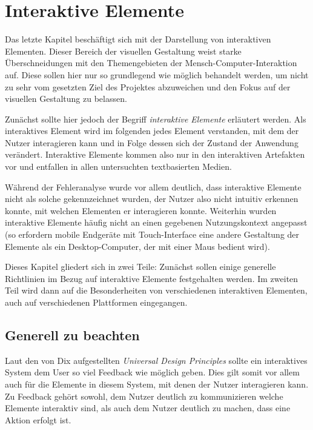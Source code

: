 
\chapter{Interaktive Elemente} %

\label{Interaktive-Elemente} %



Das letzte Kapitel beschäftigt sich mit der Darstellung von interaktiven Elementen. Dieser Bereich der visuellen Gestaltung weist starke Überschneidungen mit den Themengebieten der Mensch-Computer-Interaktion auf. Diese sollen hier nur so grundlegend wie möglich behandelt werden, um nicht zu sehr vom gesetzten Ziel des Projektes abzuweichen und den Fokus auf der visuellen Gestaltung zu belassen.

Zunächst sollte hier jedoch der Begriff \textit{interaktive Elemente} erläutert werden. Als interaktives Element wird im folgenden jedes Element verstanden, mit dem der Nutzer interagieren kann und in Folge dessen sich der Zustand der Anwendung verändert. Interaktive Elemente kommen also nur in den interaktiven Artefakten vor und entfallen in allen untersuchten textbasierten Medien.

Während der Fehleranalyse wurde vor allem deutlich, dass interaktive Elemente nicht als solche gekennzeichnet wurden, der Nutzer also nicht intuitiv erkennen konnte, mit welchen Elementen er interagieren konnte. Weiterhin wurden interaktive Elemente häufig nicht an einen gegebenen Nutzungskontext angepasst (so erfordern mobile Endgeräte mit Touch-Interface eine andere Gestaltung der Elemente als ein Desktop-Computer, der mit einer Maus bedient wird).

Dieses Kapitel gliedert sich in zwei Teile: Zunächst sollen einige generelle Richtlinien im Bezug auf interaktive Elemente festgehalten werden. Im zweiten Teil wird dann auf die Besonderheiten von verschiedenen interaktiven Elementen, auch auf verschiedenen Plattformen eingegangen.

\section{Generell zu beachten}
Laut den von Dix aufgestellten \textit{Universal Design Principles} \cite[S.367]{dix2009human} sollte ein interaktives System dem User so viel Feedback wie möglich geben. Dies gilt somit vor allem auch für die Elemente in diesem System, mit denen der Nutzer interagieren kann.
Zu Feedback gehört sowohl, dem Nutzer deutlich zu kommunizieren welche Elemente interaktiv sind, als auch dem Nutzer deutlich zu machen, dass eine Aktion erfolgt ist.

